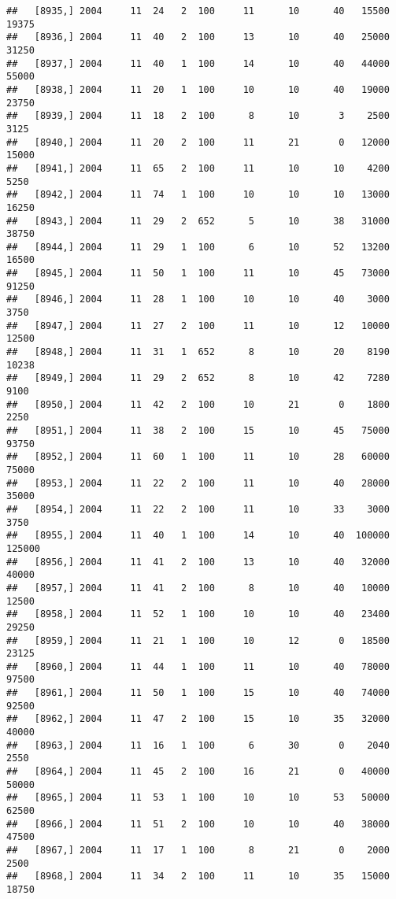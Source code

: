 \documentclass{article}\usepackage[]{graphicx}\usepackage[]{color}
\makeatletter
\newenvironment{kframe}{%
 \def\at@end@of@kframe{}%
 \ifinner\ifhmode%
  \def\at@end@of@kframe{\end{minipage}}%
  \begin{minipage}{\columnwidth}%
 \fi\fi%
 \def\FrameCommand##1{\hskip\@totalleftmargin \hskip-\fboxsep
 \colorbox{shadecolor}{##1}\hskip-\fboxsep
     \hskip-\linewidth \hskip-\@totalleftmargin \hskip\columnwidth}%
 \MakeFramed {\advance\hsize-\width
   \@totalleftmargin\z@ \linewidth\hsize
   \@setminipage}}%
 {\par\unskip\endMakeFramed%
 \at@end@of@kframe}
\newenvironment{knitrout}{}{} %
\makeatother
\begin{document}
\begin{knitrout}
\begin{kframe}
\begin{verbatim}
##   [8935,] 2004     11  24   2  100     11      10      40   15500   19375
##   [8936,] 2004     11  40   2  100     13      10      40   25000   31250
##   [8937,] 2004     11  40   1  100     14      10      40   44000   55000
##   [8938,] 2004     11  20   1  100     10      10      40   19000   23750
##   [8939,] 2004     11  18   2  100      8      10       3    2500    3125
##   [8940,] 2004     11  20   2  100     11      21       0   12000   15000
##   [8941,] 2004     11  65   2  100     11      10      10    4200    5250
##   [8942,] 2004     11  74   1  100     10      10      10   13000   16250
##   [8943,] 2004     11  29   2  652      5      10      38   31000   38750
##   [8944,] 2004     11  29   1  100      6      10      52   13200   16500
##   [8945,] 2004     11  50   1  100     11      10      45   73000   91250
##   [8946,] 2004     11  28   1  100     10      10      40    3000    3750
##   [8947,] 2004     11  27   2  100     11      10      12   10000   12500
##   [8948,] 2004     11  31   1  652      8      10      20    8190   10238
##   [8949,] 2004     11  29   2  652      8      10      42    7280    9100
##   [8950,] 2004     11  42   2  100     10      21       0    1800    2250
##   [8951,] 2004     11  38   2  100     15      10      45   75000   93750
##   [8952,] 2004     11  60   1  100     11      10      28   60000   75000
##   [8953,] 2004     11  22   2  100     11      10      40   28000   35000
##   [8954,] 2004     11  22   2  100     11      10      33    3000    3750
##   [8955,] 2004     11  40   1  100     14      10      40  100000  125000
##   [8956,] 2004     11  41   2  100     13      10      40   32000   40000
##   [8957,] 2004     11  41   2  100      8      10      40   10000   12500
##   [8958,] 2004     11  52   1  100     10      10      40   23400   29250
##   [8959,] 2004     11  21   1  100     10      12       0   18500   23125
##   [8960,] 2004     11  44   1  100     11      10      40   78000   97500
##   [8961,] 2004     11  50   1  100     15      10      40   74000   92500
##   [8962,] 2004     11  47   2  100     15      10      35   32000   40000
##   [8963,] 2004     11  16   1  100      6      30       0    2040    2550
##   [8964,] 2004     11  45   2  100     16      21       0   40000   50000
##   [8965,] 2004     11  53   1  100     10      10      53   50000   62500
##   [8966,] 2004     11  51   2  100     10      10      40   38000   47500
##   [8967,] 2004     11  17   1  100      8      21       0    2000    2500
##   [8968,] 2004     11  34   2  100     11      10      35   15000   18750

\end{verbatim}
\end{kframe}
\end{knitrout}
\end{document}
